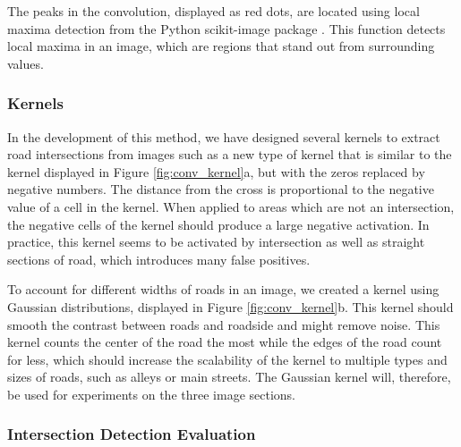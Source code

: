 The peaks in the convolution, displayed as red dots, are located using local maxima detection from the Python scikit-image package \cite{scikit-image}. This function detects local maxima in an image, which are regions that stand out from surrounding values. 

\subsubsection{Kernels}
In the development of this method, we have designed several kernels to extract road intersections from images such as a new type of kernel that is similar to the kernel displayed in Figure \ref{fig:conv_kernel}a, but with the zeros replaced by negative numbers. The distance from the cross is proportional to the negative value of a cell in the kernel. When applied to areas which are not an intersection, the negative cells of the kernel should produce a large negative activation. In practice, this kernel seems to be activated by intersection as well as straight sections of road, which introduces many false positives.

To account for different widths of roads in an image, we created a kernel using Gaussian distributions, displayed in Figure \ref{fig:conv_kernel}b. This kernel should smooth the contrast between roads and roadside and might remove noise. This kernel counts the center of the road the most while the edges of the road count for less, which should increase the scalability of the kernel to multiple types and sizes of roads, such as alleys or main streets. The Gaussian kernel will, therefore, be used for experiments on the three image sections.

\subsubsection{Intersection Detection Evaluation}

